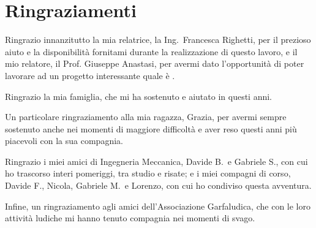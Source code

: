 \chapter*{Ringraziamenti}
\thispagestyle{empty}

Ringrazio innanzitutto la mia relatrice, la Ing.\ Francesca Righetti, per il
prezioso aiuto e la disponibilità fornitami durante la realizzazione di questo
lavoro, e il mio relatore, il Prof. Giuseppe Anastasi, per avermi dato
l'opportunità di poter lavorare ad un progetto interessante quale è \MonIQA.

Ringrazio la mia famiglia, che mi ha sostenuto e aiutato in questi anni.

Un particolare ringraziamento alla mia ragazza, Grazia, per avermi sempre
sostenuto anche nei momenti di maggiore difficoltà e aver reso questi anni più
piacevoli con la sua compagnia.

Ringrazio i miei amici di Ingegneria Meccanica, Davide B.\ e Gabriele S., con
cui ho trascorso interi pomeriggi, tra studio e risate; e i miei compagni di
corso, Davide F., Nicola, Gabriele M.\ e Lorenzo, con cui ho condiviso questa
avventura.

Infine, un ringraziamento agli amici dell'Associazione Garfaludica, che con le
loro attività ludiche mi hanno tenuto compagnia nei momenti di svago.
